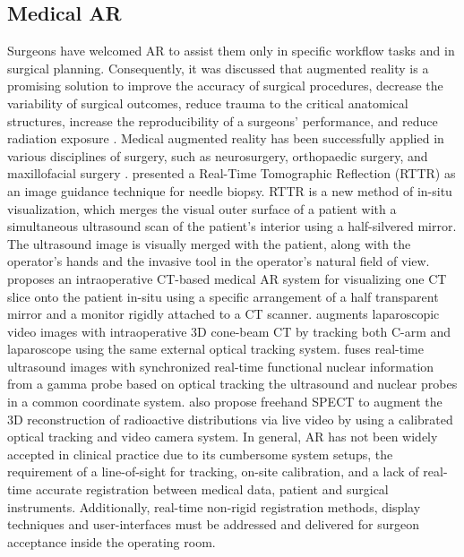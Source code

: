 \subsection{Medical AR}
Surgeons have welcomed AR to assist them only in specific workflow tasks and in surgical planning. Consequently, it was discussed that augmented reality is a promising solution to improve the accuracy of surgical procedures, decrease the variability of surgical outcomes, reduce trauma to the critical anatomical structures, increase the reproducibility of a surgeons' performance, and reduce radiation exposure \cite{Navab2012b}. 
Medical augmented reality has been successfully applied in various disciplines of surgery, such as neurosurgery, orthopaedic surgery, and maxillofacial surgery \cite{Fallavollita2016}.
\citet{Stetten2005} presented a Real-Time Tomographic Reflection (RTTR) as an image guidance technique for needle biopsy. RTTR is a new method of in-situ visualization, which merges the visual outer surface of a patient with a simultaneous ultrasound scan of the patient’s interior using a half-silvered mirror. The ultrasound image is visually merged with the patient, along with the operator's hands and the invasive tool in the operator’s natural field of view. 
\citet{Fichtinger2005} proposes an intraoperative CT-based medical AR system for visualizing one CT slice onto the patient in-situ using a specific arrangement of a half transparent mirror and a monitor rigidly attached to a CT scanner.  
\citet{Feuerstein2008} augments laparoscopic video images with intraoperative 3D cone-beam CT by tracking both C-arm and laparoscope using the same external optical tracking system. 
\citet{Wendler2007} fuses real-time ultrasound images with synchronized real-time functional nuclear information from a gamma probe based on optical tracking the ultrasound and nuclear probes in a common coordinate system. 
\citet{Wendler2007a} also propose freehand SPECT to augment the 3D reconstruction of radioactive distributions via live video by using a calibrated optical tracking and video camera system.  
In general, AR has not been widely accepted in clinical practice due to its cumbersome system setups, the requirement of a line-of-sight for tracking, on-site calibration, and a lack of real-time accurate registration between medical data, patient and surgical instruments. Additionally, real-time non-rigid registration methods, display techniques and user-interfaces must be addressed and delivered for surgeon acceptance inside the operating room.

